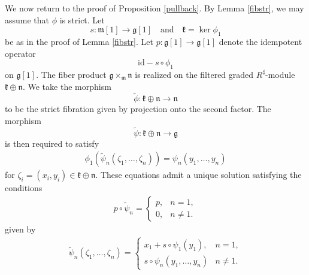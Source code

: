 \documentclass[12pt]{amsart}
\numberwithin{equation}{section}
\theoremstyle{plain}
\newcommand{\fg}{\mathfrak{g}}
\newcommand{\fk}{\mathfrak{k}}
\newcommand{\fm}{\mathfrak{m}}
\newcommand{\fn}{\mathfrak{n}}
\newcommand{\id}{\mathrm{id}}
\newcommand{\uR}{{R^\sharp}}
\begin{document}
	We now return to the proof of Proposition \ref{pullback}. By Lemma \ref{fibstr}, we may assume that $\phi$ is strict. Let 
	\[
	s\colon \fm[1] \rightarrow \fg[1] \quad \text{and} \quad \fk = \ker \phi_1
	\]
	be as in the proof of Lemma \ref{fibstr}. Let $p\colon \fg[1] \rightarrow \fg[1]$ denote the idempotent operator 
	\[
	\id - s \circ \phi_1
	\]
	on $\fg[1]$. The fiber product $\fg \times_\fm \fn$ is realized on the filtered graded $\uR$-module $\fk \oplus \fn$. We take the morphism
	\[
	\widetilde{\phi} \colon \fk \oplus \fn \longrightarrow \fn
	\]
	to be the strict fibration given by projection onto the second factor. The morphism
	\[
	\widetilde{\psi} \colon \fk \oplus \fn \longrightarrow \fg
	\]
	is then required to satisfy
	\[
	\begin{aligned}
		\phi_1\left( \widetilde{\psi}_n(\zeta_1, \dots, \zeta_n) \right)
		=
		\psi_n\left( y_1, \dots, y_n \right)
	\end{aligned}
	\]
	for $\zeta_i = (x_i, y_i) \in \fk \oplus \fn$. These equations admit a unique solution satisfying the conditions
	\begin{align*}
		p \circ \widetilde{\psi}_{n}  = 
		\begin{cases}
			p, & n=1,\\
			0, & n\neq 1.
		\end{cases}
	\end{align*}
	given by
	\begin{equation}\label{solpsi}
		\begin{aligned}
			\widetilde{\psi}_n(\zeta_1, \dots, \zeta_n) =
			\begin{cases}
				x_1 + s \circ \psi_1(y_1), & n=1,\\
				s \circ \psi_n(y_1, \dots, y_n) & n\neq 1.
			\end{cases}
		\end{aligned}
	\end{equation}
	
\end{document}
